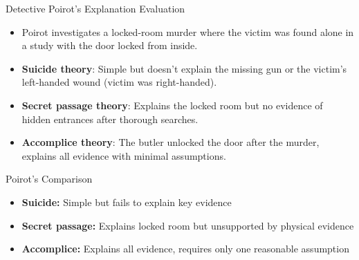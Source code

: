 \documentclass{beamer}
\begin{document}
\begin{frame}{Detective Poirot's Explanation Evaluation}
	\begin{itemize}
		\item Poirot investigates a locked-room murder where the victim was found alone in a study with the door locked from inside.
		\item \textbf{Suicide theory}: Simple but doesn't explain the missing gun or the victim's left-handed wound (victim was right-handed).
		\item \textbf{Secret passage theory}: Explains the locked room but no evidence of hidden entrances after thorough searches.
		\item \textbf{Accomplice theory}: The butler unlocked the door after the murder, explains all evidence with minimal assumptions.
	\end{itemize}
	
	\begin{block}{Poirot's Comparison}
		\scriptsize
		\begin{itemize}
			\item \textbf{Suicide:} Simple but fails to explain key evidence
			\item \textbf{Secret passage:} Explains locked room but unsupported by physical evidence
			\item \textbf{Accomplice:} Explains all evidence, requires only one reasonable assumption
		\end{itemize}
	\end{block}
\end{frame}
\end{document}
